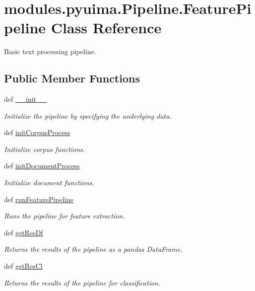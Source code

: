 \hypertarget{classmodules_1_1pyuima_1_1Pipeline_1_1FeaturePipeline}{\section{modules.\-pyuima.\-Pipeline.\-Feature\-Pipeline \-Class \-Reference}
\label{classmodules_1_1pyuima_1_1Pipeline_1_1FeaturePipeline}
}


\-Basic text processing pipeline.  


\subsection*{\-Public \-Member \-Functions}
\begin{DoxyCompactItemize}
\item 
def \hyperlink{classmodules_1_1pyuima_1_1Pipeline_1_1FeaturePipeline_a541bbacc712ff22084c643522614767d}{\-\_\-\-\_\-init\-\_\-\-\_\-}
\begin{DoxyCompactList}\small\item\em \-Initialize the pipeline by specifying the underlying data. \end{DoxyCompactList}\item 
def \hyperlink{classmodules_1_1pyuima_1_1Pipeline_1_1FeaturePipeline_a7974a8ffdebf9ccb76621e1485a5ebeb}{init\-Corpus\-Process}
\begin{DoxyCompactList}\small\item\em \-Initialize corpus functions. \end{DoxyCompactList}\item 
def \hyperlink{classmodules_1_1pyuima_1_1Pipeline_1_1FeaturePipeline_a2512771e9c094636e7bd4416d2154204}{init\-Document\-Process}
\begin{DoxyCompactList}\small\item\em \-Initialize document functions. \end{DoxyCompactList}\item 
def \hyperlink{classmodules_1_1pyuima_1_1Pipeline_1_1FeaturePipeline_a34f80ed11b504dae5cd6ceb3b22fe608}{run\-Feature\-Pipeline}
\begin{DoxyCompactList}\small\item\em \-Runs the pipeline for feature extraction. \end{DoxyCompactList}\item 
def \hyperlink{classmodules_1_1pyuima_1_1Pipeline_1_1FeaturePipeline_ac66ec60bd9e53c6ae02f579bd1adb4fe}{get\-Res\-Df}
\begin{DoxyCompactList}\small\item\em \-Returns the results of the pipeline as a pandas \-Data\-Frame. \end{DoxyCompactList}\item 
def \hyperlink{classmodules_1_1pyuima_1_1Pipeline_1_1FeaturePipeline_a1a843ccb1d7f3417e8227a4221f92fc5}{get\-Res\-Cl}
\begin{DoxyCompactList}\small\item\em \-Returns the results of the pipeline for classification. \end{DoxyCompactList}\end{DoxyCompactItemize}


